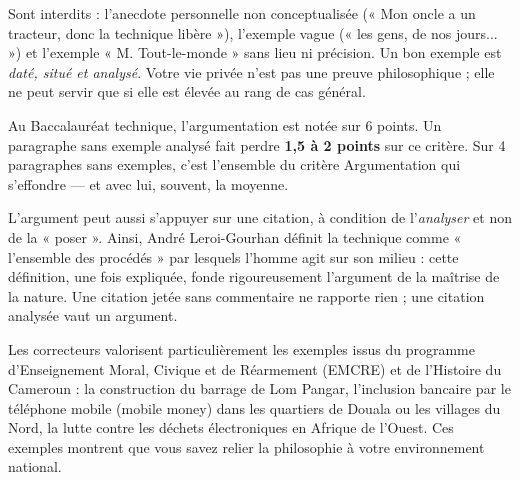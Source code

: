 \documentclass[11pt]{article}
\begin{document}
\begin{attention}
Sont interdits : l'anecdote personnelle non conceptualisée (« Mon oncle a un tracteur, donc la technique libère »), l'exemple vague (« les gens, de nos jours... ») et l'exemple « M. Tout-le-monde » sans lieu ni précision. Un bon exemple est \emph{daté, situé et analysé}. Votre vie privée n'est pas une preuve philosophique ; elle ne peut servir que si elle est élevée au rang de cas général.
\end{attention}

\begin{exemplebox}
Au Baccalauréat technique, l'argumentation est notée sur 6 points. Un paragraphe sans exemple analysé fait perdre \textbf{1,5 à 2 points} sur ce critère. Sur 4 paragraphes sans exemples, c'est l'ensemble du critère Argumentation qui s'effondre — et avec lui, souvent, la moyenne.
\end{exemplebox}

L'argument peut aussi s'appuyer sur une citation, à condition de l'\emph{analyser} et non de la « poser ». Ainsi, André Leroi-Gourhan définit la technique comme « l'ensemble des procédés » par lesquels l'homme agit sur son milieu : cette définition, une fois expliquée, fonde rigoureusement l'argument de la maîtrise de la nature. Une citation jetée sans commentaire ne rapporte rien ; une citation analysée vaut un argument.

\begin{savaistu}
Les correcteurs valorisent particulièrement les exemples issus du programme d'Enseignement Moral, Civique et de Réarmement (EMCRE) et de l'Histoire du Cameroun : la construction du barrage de Lom Pangar, l'inclusion bancaire par le téléphone mobile (mobile money) dans les quartiers de Douala ou les villages du Nord, la lutte contre les déchets électroniques en Afrique de l'Ouest. Ces exemples montrent que vous savez relier la philosophie à votre environnement national.
\end{savaistu}
\end{document}
